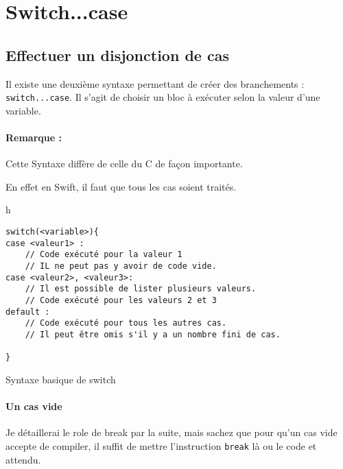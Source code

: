 \section{Switch...case}
\subsection{Effectuer un disjonction de cas}
Il existe une deuxième syntaxe permettant de créer des branchements :
\texttt{switch...case}.
Il s'agit de choisir un bloc à exécuter selon la valeur d'une variable.
\paragraph{Remarque :}Cette Syntaxe diffère de celle du C de façon importante.


En effet en Swift, il faut que tous les cas soient traités.
\begin{listing}{h}
\begin{verbatim}
switch(<variable>){
case <valeur1> :
    // Code exécuté pour la valeur 1
    // IL ne peut pas y avoir de code vide.
case <valeur2>, <valeur3>:
    // Il est possible de lister plusieurs valeurs.
    // Code exécuté pour les valeurs 2 et 3
default :
    // Code exécuté pour tous les autres cas.
    // Il peut être omis s'il y a un nombre fini de cas.

}
\end{verbatim}
\caption{Syntaxe basique de switch}
\end{listing}
\paragraph{Un cas vide}
Je détaillerai le role de break par la suite, mais sachez que pour qu'un cas vide accepte de compiler, il suffit de mettre l'instruction \texttt{break} là ou le code et attendu.
